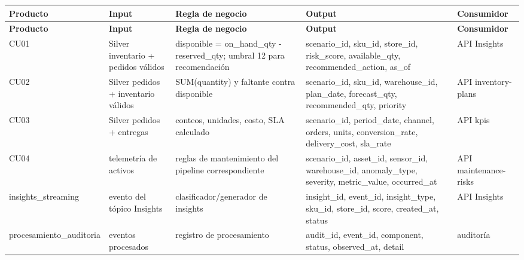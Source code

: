 \documentclass[11pt]{article}
\begin{document}
\begingroup\small
\begin{longtable}{@{}>{\raggedright\arraybackslash}p{}>{\raggedright\arraybackslash}p{}>{\raggedright\arraybackslash}p{}>{\raggedright\arraybackslash}p{}>{\raggedright\arraybackslash}p{}@{}}
\toprule
\textbf{Producto} & \textbf{Input} & \textbf{Regla de negocio} & \textbf{Output} & \textbf{Consumidor} \\
\midrule
\endfirsthead
\toprule
\textbf{Producto} & \textbf{Input} & \textbf{Regla de negocio} & \textbf{Output} & \textbf{Consumidor} \\
\midrule
\endhead
CU01 & Silver inventario + pedidos válidos & disponible = on\_\allowbreak{}hand\_\allowbreak{}qty - reserved\_\allowbreak{}qty; umbral 12 para recomendación & scenario\_\allowbreak{}id, sku\_\allowbreak{}id, store\_\allowbreak{}id, risk\_\allowbreak{}score, available\_\allowbreak{}qty, recommended\_\allowbreak{}action, as\_\allowbreak{}of & API Insights \\
CU02 & Silver pedidos + inventario válidos & SUM(quantity) y faltante contra disponible & scenario\_\allowbreak{}id, sku\_\allowbreak{}id, warehouse\_\allowbreak{}id, plan\_\allowbreak{}date, forecast\_\allowbreak{}qty, recommended\_\allowbreak{}qty, priority & API inventory-plans \\
CU03 & Silver pedidos + entregas & conteos, unidades, costo, SLA calculado & scenario\_\allowbreak{}id, period\_\allowbreak{}date, channel, orders, units, conversion\_\allowbreak{}rate, delivery\_\allowbreak{}cost, sla\_\allowbreak{}rate & API kpis \\
CU04 & telemetría de activos & reglas de mantenimiento del pipeline correspondiente & scenario\_\allowbreak{}id, asset\_\allowbreak{}id, sensor\_\allowbreak{}id, warehouse\_\allowbreak{}id, anomaly\_\allowbreak{}type, severity, metric\_\allowbreak{}value, occurred\_\allowbreak{}at & API maintenance-risks \\
insights\_\allowbreak{}streaming & evento del tópico Insights & clasificador/\allowbreak{}generador de insights & insight\_\allowbreak{}id, event\_\allowbreak{}id, insight\_\allowbreak{}type, sku\_\allowbreak{}id, store\_\allowbreak{}id, score, created\_\allowbreak{}at, status & API Insights \\
procesamiento\_\allowbreak{}auditoria & eventos procesados & registro de procesamiento & audit\_\allowbreak{}id, event\_\allowbreak{}id, component, status, observed\_\allowbreak{}at, detail & auditoría \\
\bottomrule
\end{longtable}
\endgroup
\end{document}
